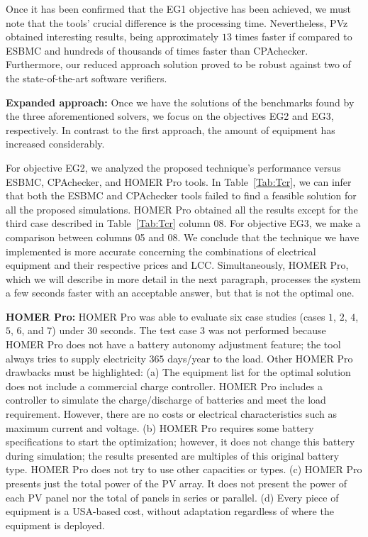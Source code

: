 \documentclass[review]{elsarticle}
\begin{document}
Once it has been confirmed that the EG1 objective has been achieved, we must note that the tools' crucial difference is the processing time. Nevertheless, PVz obtained interesting results, being approximately $13$ times faster if compared to ESBMC and hundreds of thousands of times faster than CPAchecker. Furthermore, our reduced approach solution proved to be robust against two of the state-of-the-art software verifiers.

\textbf{Expanded approach:} Once we have the solutions of the benchmarks found by the three aforementioned solvers, we focus on the objectives EG2 and EG3, respectively. In contrast to the first approach, the amount of equipment has increased considerably.

For objective EG2, we analyzed the proposed technique's performance versus ESBMC, CPAchecker, and HOMER Pro tools. In Table~\ref{Tab:Tcr}, we can infer that both the ESBMC and CPAchecker tools failed to find a feasible solution for all the proposed simulations. HOMER Pro obtained all the results except for the third case described in Table~\ref{Tab:Tcr} column 08. For objective EG3, we make a comparison between columns 05 and 08. We conclude that the technique we have implemented is more accurate concerning the combinations of electrical equipment and their respective prices and LCC. Simultaneously, HOMER Pro, which we will describe in more detail in the next paragraph, processes the system a few seconds faster with an acceptable answer, but that is not the optimal one.

\textbf{HOMER Pro:} HOMER Pro was able to evaluate six case studies (cases $1$, $2$, $4$, $5$, $6$, and $7$) under $30$ seconds. The test case $3$ was not performed because HOMER Pro does not have a battery autonomy adjustment feature; the tool always tries to supply electricity $365$ days/year to the load. Other HOMER Pro drawbacks must be highlighted: (a) The equipment list for the optimal solution does not include a commercial charge controller. HOMER Pro includes a controller to simulate the charge/discharge of batteries and meet the load requirement. However, there are no costs or electrical characteristics such as maximum current and voltage. (b) HOMER Pro requires some battery specifications to start the optimization; however, it does not change this battery during simulation; the results presented are multiples of this original battery type. HOMER Pro does not try to use other capacities or types. (c) HOMER Pro presents just the total power of the PV array. It does not present the power of each PV panel nor the total of panels in series or parallel. (d) Every piece of equipment is a USA-based cost, without adaptation regardless of where the equipment is deployed.
\end{document}
